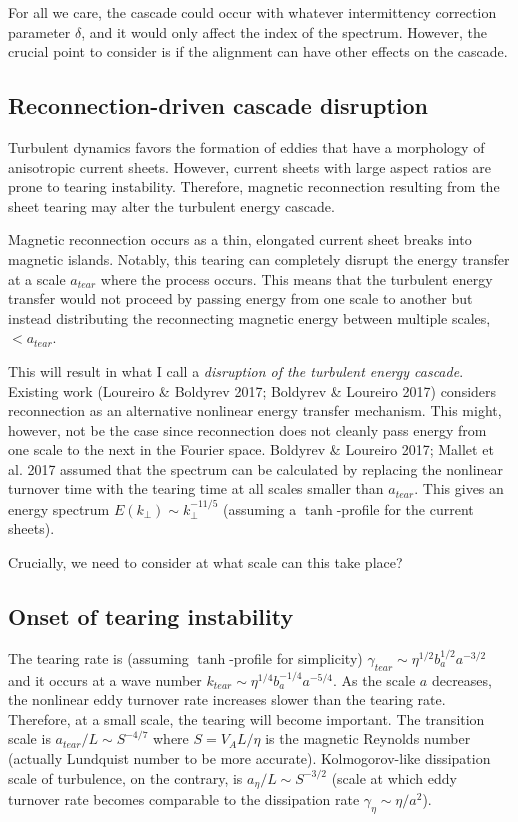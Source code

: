 \documentclass[usenatbib,twocolumn]{aastex63}
\begin{document}
\begin{appendix}
For all we care, the cascade could occur with whatever intermittency correction parameter $\delta$, and it would only affect the index of the spectrum.
However, the crucial point to consider is if the alignment can have other effects on the cascade.



\subsection{Reconnection-driven cascade disruption}

Turbulent dynamics favors the formation of eddies that have a morphology of anisotropic current sheets.
However, current sheets with large aspect ratios are prone to tearing instability.
Therefore, magnetic reconnection resulting from the sheet tearing may alter the turbulent energy cascade.

Magnetic reconnection occurs as a thin, elongated current sheet breaks into magnetic islands.
Notably, this tearing can completely disrupt the energy transfer at a scale $a_{tear}$ where the process occurs.
This means that the turbulent energy transfer would not proceed by passing energy from one scale to another but instead distributing the reconnecting magnetic energy between multiple scales, $<a_{tear}$.

This will result in what I call a \textit{disruption of the turbulent energy cascade}.
Existing work (Loureiro \& Boldyrev 2017; Boldyrev \& Loureiro 2017) considers reconnection as an alternative nonlinear energy transfer mechanism. 
This might, however, not be the case since reconnection does not cleanly pass energy from one scale to the next in the Fourier space.
Boldyrev \& Loureiro 2017; Mallet et al. 2017 assumed that the spectrum can be calculated by replacing the nonlinear turnover time with the tearing time at all scales smaller than $a_{tear}$.
This gives an energy spectrum $E(k_\perp) \sim k_\perp^{-11/5}$ (assuming a $\tanh$-profile for the current sheets).

Crucially, we need to consider at what scale can this take place?


\subsection{Onset of tearing instability}


The tearing rate is (assuming $\tanh$-profile for simplicity) $\gamma_{tear} \sim \eta^{1/2} b_a^{1/2} a^{-3/2}$ and it occurs at a wave number $k_{tear} \sim \eta^{1/4} b_a^{-1/4} a^{-5/4}$.
As the scale $a$ decreases, the nonlinear eddy turnover rate increases slower than the tearing rate.
Therefore, at a small scale, the tearing will become important.
The transition scale is $a_{tear}/L \sim S^{-4/7}$ where $S = V_A L/\eta$ is the magnetic Reynolds number (actually Lundquist number to be more accurate).
Kolmogorov-like dissipation scale of turbulence, on the contrary, is $a_\eta/L \sim S^{-3/2}$ (scale at which eddy turnover rate becomes comparable to the dissipation rate $\gamma_\eta \sim \eta/a^2$).


\end{appendix}
\end{document}
